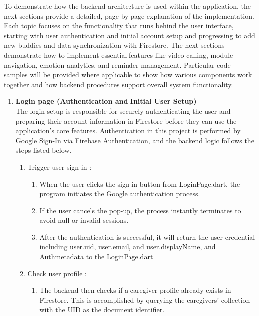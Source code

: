 { 
	\setlength{\leftskip}{1.8cm}
	\setlength{\parindent}{5em}
	To demonstrate how the backend architecture is used within the application, the next sections provide a detailed, page by page explanation of the implementation. Each topic focuses on the functionality that runs behind the user interface, starting with user authentication and initial account setup and progressing to add new buddies and data synchronization with Firestore. The next sections demonstrate how to implement essential features like video calling, module navigation, emotion analytics, and reminder management. Particular code samples will be provided where applicable to show how various components work together and how backend procedures support overall system functionality.
	\par
	}
\begin{enumerate}[leftmargin=2.2cm]
	\item\textbf{Login page (Authentication and Initial User Setup)} 
	\\The login setup is responsible for securely authenticating the user and preparing their account information in Firestore before they can use the application's core features. Authentication in this project is performed by Google Sign-In via Firebase Authentication, and the backend logic follows the steps listed below.


	\begin{enumerate}[leftmargin=1.2cm, label=\arabic*.]
		\item Trigger user sign in :
		\begin{enumerate}[label=\alph*.] 
			\item When the user clicks the sign-in button from LoginPage.dart, the program initiates the Google authentication process.
			\item If the user cancels the pop-up, the process instantly terminates to avoid null or invalid sessions.
			\item After the authentication is successful, it will return the user credential including user.uid, user.email, and user.displayName, and Authmetadata to the LoginPage.dart
		\end{enumerate}
		
		\item Check user profile :
		\begin{enumerate}[label=\alph*.] 
			\item The backend then checks if a caregiver profile already exists in Firestore. 	This is accomplished by querying the caregivers' collection with the UID as the document identifier.
		\end{enumerate}
	

\end{enumerate}
\end{enumerate}
